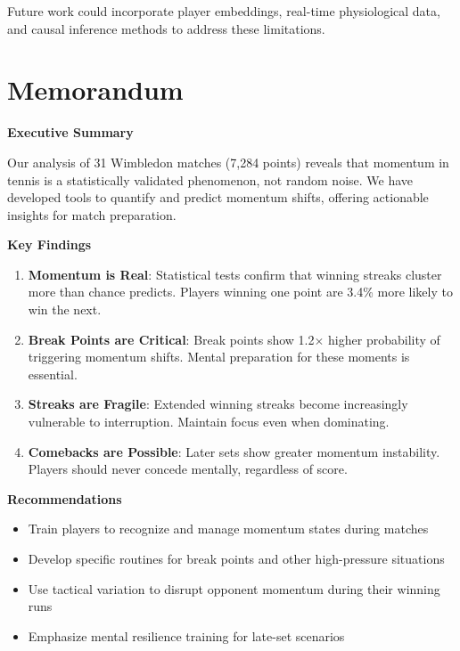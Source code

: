 \documentclass{mcmthesis}
\begin{document}
Future work could incorporate player embeddings, real-time physiological data, and causal inference methods to address these limitations.

\newpage
\thispagestyle{fancy}
\section{Memorandum}
\memodate{\today}
\begin{memo}[Memorandum]

\textbf{Executive Summary}

Our analysis of 31 Wimbledon matches (7,284 points) reveals that momentum in tennis is a statistically validated phenomenon, not random noise. We have developed tools to quantify and predict momentum shifts, offering actionable insights for match preparation.

\textbf{Key Findings}

\begin{enumerate}
    \item \textbf{Momentum is Real}: Statistical tests confirm that winning streaks cluster more than chance predicts. Players winning one point are 3.4\% more likely to win the next.
    
    \item \textbf{Break Points are Critical}: Break points show 1.2$\times$ higher probability of triggering momentum shifts. Mental preparation for these moments is essential.
    
    \item \textbf{Streaks are Fragile}: Extended winning streaks become increasingly vulnerable to interruption. Maintain focus even when dominating.
    
    \item \textbf{Comebacks are Possible}: Later sets show greater momentum instability. Players should never concede mentally, regardless of score.
\end{enumerate}

\textbf{Recommendations}

\begin{itemize}
    \item Train players to recognize and manage momentum states during matches
    \item Develop specific routines for break points and other high-pressure situations
    \item Use tactical variation to disrupt opponent momentum during their winning runs
    \item Emphasize mental resilience training for late-set scenarios
\end{itemize}


\end{memo}
\end{document}
